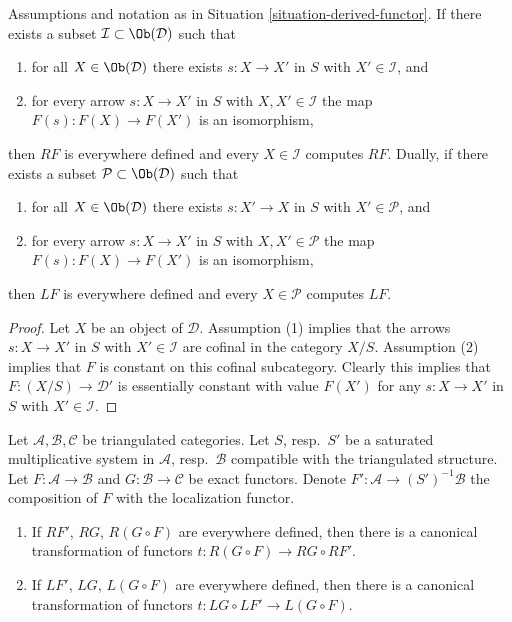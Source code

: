 \begin{lemma}
\label{lemma-find-existence-computes}
Assumptions and notation as in
Situation \ref{situation-derived-functor}.
If there exists a subset $\mathcal{I} \subset \Ob(\mathcal{D})$
such that
\begin{enumerate}
\item for all $X \in \Ob(\mathcal{D})$
there exists $s : X \to X'$ in $S$ with $X' \in \mathcal{I}$,
and
\item for every arrow $s : X \to X'$ in $S$ with $X, X' \in \mathcal{I}$
the map $F(s) : F(X) \to F(X')$ is an isomorphism,
\end{enumerate}
then $RF$ is everywhere defined and every $X \in \mathcal{I}$
computes $RF$. Dually, if there exists a subset
$\mathcal{P} \subset \Ob(\mathcal{D})$
such that
\begin{enumerate}
\item for all $X \in \Ob(\mathcal{D})$
there exists $s : X' \to X$ in $S$ with $X' \in \mathcal{P}$,
and
\item for every arrow $s : X \to X'$ in $S$ with $X, X' \in \mathcal{P}$
the map $F(s) : F(X) \to F(X')$ is an isomorphism,
\end{enumerate}
then $LF$ is everywhere defined and every $X \in \mathcal{P}$
computes $LF$.
\end{lemma}

\begin{proof}
Let $X$ be an object of $\mathcal{D}$.
Assumption (1) implies that the arrows $s : X \to X'$ in $S$ with
$X' \in \mathcal{I}$ are cofinal in the category $X/S$. Assumption
(2) implies that $F$ is constant on this cofinal subcategory.
Clearly this implies that $F : (X/S) \to \mathcal{D}'$ is essentially
constant with value $F(X')$ for any $s : X \to X'$ in $S$
with $X' \in \mathcal{I}$.
\end{proof}

\begin{lemma}
\label{lemma-compose-derived-functors-general}
Let $\mathcal{A}, \mathcal{B}, \mathcal{C}$ be triangulated categories.
Let $S$, resp.\ $S'$ be a saturated multiplicative system in
$\mathcal{A}$, resp.\ $\mathcal{B}$ compatible with the triangulated structure.
Let $F : \mathcal{A} \to \mathcal{B}$ and $G : \mathcal{B} \to \mathcal{C}$
be exact functors. Denote $F' : \mathcal{A} \to (S')^{-1}\mathcal{B}$ the
composition of $F$ with the localization functor.
\begin{enumerate}
\item If $RF'$, $RG$, $R(G \circ F)$ are everywhere defined, then there
is a canonical transformation of functors
$t : R(G \circ F) \longrightarrow RG \circ RF'$.
\item If $LF'$, $LG$, $L(G \circ F)$ are everywhere defined, then there
is a canonical transformation of functors
$t : LG \circ LF' \to L(G \circ F)$.
\end{enumerate}
\end{lemma}

